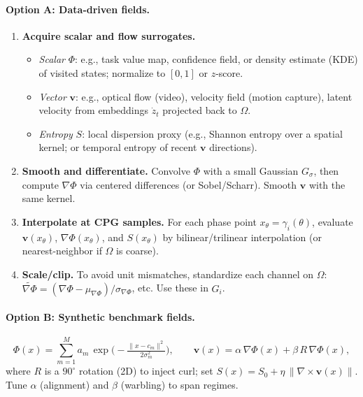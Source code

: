 \documentclass[a4paper,11pt]{article}
\begin{document}
\paragraph{Option A: Data-driven fields.}
\begin{enumerate}
\item \textbf{Acquire scalar and flow surrogates.}
    \begin{itemize}
        \item \emph{Scalar} $\Phi$: e.g., task value map, confidence field, or density estimate (KDE) of visited states; normalize to $[0,1]$ or $z$-score.
        \item \emph{Vector} $\mathbf v$: e.g., optical flow (video), velocity field (motion capture), latent velocity from embeddings $\dot z_t$ projected back to $\Omega$.
        \item \emph{Entropy} $S$: local dispersion proxy (e.g., Shannon entropy over a spatial kernel; or temporal entropy of recent \(\mathbf v\) directions).
    \end{itemize}
\item \textbf{Smooth and differentiate.} Convolve $\Phi$ with a small Gaussian \(G_\sigma\), then compute $\nabla\Phi$ via centered differences (or Sobel/Scharr). Smooth $\mathbf v$ with the same kernel.
\item \textbf{Interpolate at CPG samples.} For each phase point $x_\theta=\gamma_i(\theta)$, evaluate $\mathbf v(x_\theta)$, $\nabla\Phi(x_\theta)$, and $S(x_\theta)$ by bilinear/trilinear interpolation (or nearest-neighbor if $\Omega$ is coarse).
\item \textbf{Scale/clip.} To avoid unit mismatches, standardize each channel on \(\Omega\): $\widetilde{\nabla\Phi}=(\nabla\Phi-\mu_{\nabla\Phi})/\sigma_{\nabla\Phi}$, etc. Use these in \(G_i\).
\end{enumerate}

\paragraph{Option B: Synthetic benchmark fields.}
\[
\Phi(x)=\sum_{m=1}^M a_m\,\exp\!\big(-\tfrac{\|x-c_m\|^2}{2\sigma_m^2}\big),\qquad
\mathbf v(x)=\alpha\,\nabla\Phi(x)+\beta\,R\,\nabla\Phi(x),
\]
where \(R\) is a \(90^\circ\) rotation (2D) to inject curl; set \(S(x)=S_0+\eta\,\|\nabla\times\mathbf v(x)\|\).
Tune \(\alpha\) (alignment) and \(\beta\) (warbling) to span regimes.
\end{document}

